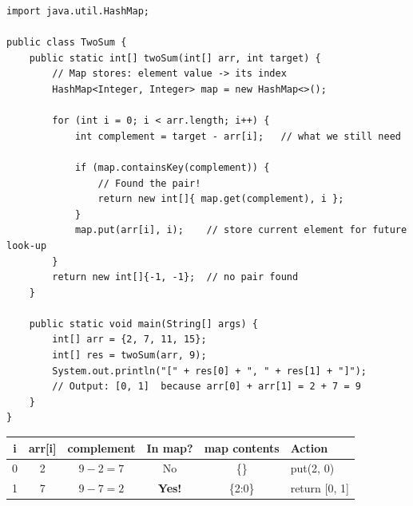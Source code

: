\documentclass[12pt,a4paper,oneside]{book}
\begin{document}
\begin{lstlisting}[caption={Two Sum --- HashMap approach O(n) time O(n) space}]
import java.util.HashMap;

public class TwoSum {
    public static int[] twoSum(int[] arr, int target) {
        // Map stores: element value -> its index
        HashMap<Integer, Integer> map = new HashMap<>();

        for (int i = 0; i < arr.length; i++) {
            int complement = target - arr[i];   // what we still need

            if (map.containsKey(complement)) {
                // Found the pair!
                return new int[]{ map.get(complement), i };
            }
            map.put(arr[i], i);    // store current element for future look-up
        }
        return new int[]{-1, -1};  // no pair found
    }

    public static void main(String[] args) {
        int[] arr = {2, 7, 11, 15};
        int[] res = twoSum(arr, 9);
        System.out.println("[" + res[0] + ", " + res[1] + "]");
        // Output: [0, 1]  because arr[0] + arr[1] = 2 + 7 = 9
    }
}
\end{lstlisting}

\begin{dryrun}[Dry Run: arr = \{2, 7, 11, 15\}, target = 9]
\begin{center}
\begin{tabular}{cccccl}
\toprule
\textbf{i} & \textbf{arr[i]} & \textbf{complement} & \textbf{In map?} & \textbf{map contents} & \textbf{Action}\\
\midrule
0 & 2  & $9-2=7$  & No       & \{\}          & put(2, 0)\\
1 & 7  & $9-7=2$  & \textbf{Yes!} & \{2:0\}  & return [0, 1]\\
\bottomrule
\end{tabular}
\end{center}
\end{dryrun}
\end{document}
